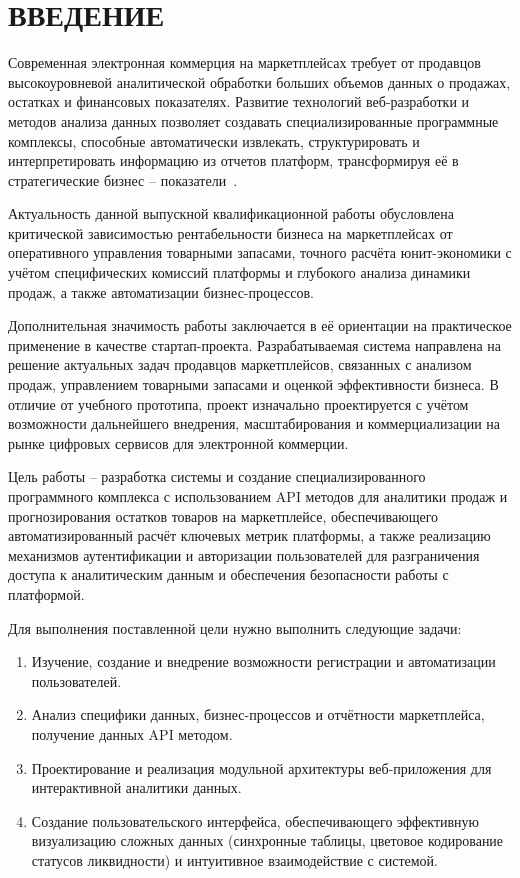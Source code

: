 \chapter*{ВВЕДЕНИЕ}

Современная электронная коммерция на маркетплейсах требует от продавцов высокоуровневой аналитической обработки больших объемов данных о продажах, остатках и финансовых показателях. Развитие технологий веб-разработки и методов анализа данных позволяет создавать специализированные программные комплексы, способные автоматически извлекать, структурировать и интерпретировать информацию из отчетов платформ, трансформируя её в стратегические бизнес – показатели~\cite{problemSellers}.

Актуальность данной выпускной квалификационной работы обусловлена критической зависимостью рентабельности бизнеса на маркетплейсах от оперативного управления товарными запасами, точного расчёта юнит-экономики с учётом специфических комиссий платформы и глубокого анализа динамики продаж, а также автоматизации бизнес-процессов. 

Дополнительная значимость работы заключается в её ориентации на практическое применение в качестве стартап-проекта. Разрабатываемая система направлена на решение актуальных задач продавцов маркетплейсов, связанных с анализом продаж, управлением товарными запасами и оценкой эффективности бизнеса. В отличие от учебного прототипа, проект изначально проектируется с учётом возможности дальнейшего внедрения, масштабирования и коммерциализации на рынке цифровых сервисов для электронной коммерции.

Цель работы – разработка системы и создание специализированного программного комплекса с использованием API методов для аналитики продаж и прогнозирования остатков товаров на маркетплейсе, обеспечивающего автоматизированный расчёт ключевых метрик платформы, а также реализацию механизмов аутентификации и авторизации пользователей для разграничения доступа к аналитическим данным и обеспечения безопасности работы с платформой.

Для выполнения поставленной цели нужно выполнить следующие задачи:

\begin{enumerate}
\item Изучение, создание и внедрение возможности регистрации и автоматизации пользователей.
\item Анализ специфики данных, бизнес-процессов и отчётности маркетплейса, получение данных API методом.
\item Проектирование и реализация модульной архитектуры веб-приложения для интерактивной аналитики данных.
\item Создание пользовательского интерфейса, обеспечивающего эффективную визуализацию сложных данных (синхронные таблицы, цветовое кодирование статусов ликвидности) и интуитивное взаимодействие с системой.
\end{enumerate}



